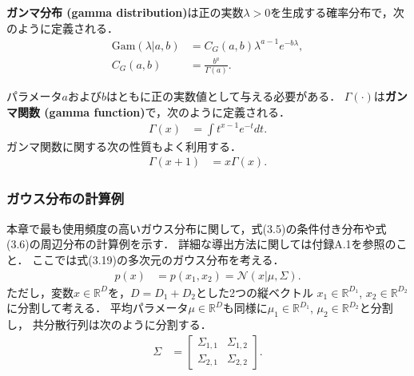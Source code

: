 \documentclass[11pt,a4paper]{jsarticle}
\numberwithin{equation}{section}
\begin{document}
\textbf{ガンマ分布 (gamma distribution)}は正の実数$\lambda > 0$を生成する確率分布で，次のように定義される．
\begin{align}
\mathrm{Gam} (\lambda | a, b)
& =
C_G (a, b) \lambda^{a - 1} e^{-b \lambda}, \\
C_G (a, b)
& =
\frac{b^a}{\Gamma(a)}.
\end{align}

パラメータ$a$および$b$はともに正の実数値として与える必要がある．
$\Gamma (\cdot)$は\textbf{ガンマ関数 (gamma function)}で，次のように定義される．
\begin{align}
\Gamma(x)
& =
\int t^{x - 1} e^{-t} dt.
\end{align}
ガンマ関数に関する次の性質もよく利用する．
\begin{align}
\Gamma(x + 1)
& =
x \Gamma(x).
\end{align}

\subsubsection{ガウス分布の計算例}
本章で最も使用頻度の高いガウス分布に関して，式(3.5)の条件付き分布や式(3.6)の周辺分布の計算例を示す．
詳細な導出方法に関しては付録A.1を参照のこと．
ここでは式(3.19)の多次元のガウス分布を考える．
\begin{align}
p(x)
& =
p(x_1, x_2)
= \mathcal{N} (x | \mu, \Sigma).
\end{align}
ただし，変数$x \in \mathbb{R}^D$を，$D = D_1 + D_2$とした2つの縦ベクトル
$x_1 \in \mathbb{R}^{D_1}$, $x_2 \in \mathbb{R}^{D_2}$に分割して考える．
平均パラメータ$\mu \in \mathbb{R}^D$も同様に$\mu_1 \in \mathbb{R}^{D_1}$, $\mu_2 \in \mathbb{R}^{D_2}$と分割し，
共分散行列は次のように分割する．
\begin{align}
\Sigma
& =
\begin{bmatrix}
\Sigma_{1, 1} & \Sigma_{1, 2} \\
\Sigma_{2, 1} & \Sigma_{2, 2}
\end{bmatrix}.
\end{align}
\end{document}
